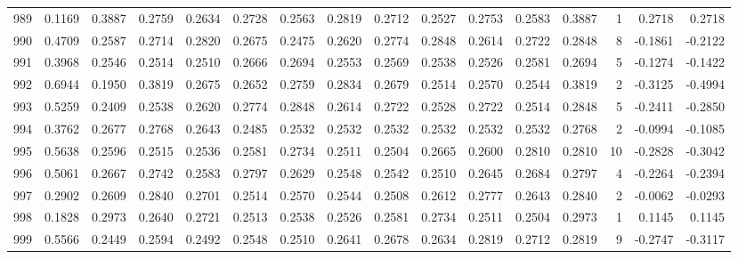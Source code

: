\begin{tabular}{lrrrrrrrrrrrrrrr}
989 &      0.1169 &  0.3887 &  0.2759 &  0.2634 &  0.2728 &  0.2563 &  0.2819 &  0.2712 &  0.2527 &  0.2753 &   0.2583 &     0.3887 &      1 &                    0.2718 &                     0.2718 \\
990 &      0.4709 &  0.2587 &  0.2714 &  0.2820 &  0.2675 &  0.2475 &  0.2620 &  0.2774 &  0.2848 &  0.2614 &   0.2722 &     0.2848 &      8 &                   -0.1861 &                    -0.2122 \\
991 &      0.3968 &  0.2546 &  0.2514 &  0.2510 &  0.2666 &  0.2694 &  0.2553 &  0.2569 &  0.2538 &  0.2526 &   0.2581 &     0.2694 &      5 &                   -0.1274 &                    -0.1422 \\
992 &      0.6944 &  0.1950 &  0.3819 &  0.2675 &  0.2652 &  0.2759 &  0.2834 &  0.2679 &  0.2514 &  0.2570 &   0.2544 &     0.3819 &      2 &                   -0.3125 &                    -0.4994 \\
993 &      0.5259 &  0.2409 &  0.2538 &  0.2620 &  0.2774 &  0.2848 &  0.2614 &  0.2722 &  0.2528 &  0.2722 &   0.2514 &     0.2848 &      5 &                   -0.2411 &                    -0.2850 \\
994 &      0.3762 &  0.2677 &  0.2768 &  0.2643 &  0.2485 &  0.2532 &  0.2532 &  0.2532 &  0.2532 &  0.2532 &   0.2532 &     0.2768 &      2 &                   -0.0994 &                    -0.1085 \\
995 &      0.5638 &  0.2596 &  0.2515 &  0.2536 &  0.2581 &  0.2734 &  0.2511 &  0.2504 &  0.2665 &  0.2600 &   0.2810 &     0.2810 &     10 &                   -0.2828 &                    -0.3042 \\
996 &      0.5061 &  0.2667 &  0.2742 &  0.2583 &  0.2797 &  0.2629 &  0.2548 &  0.2542 &  0.2510 &  0.2645 &   0.2684 &     0.2797 &      4 &                   -0.2264 &                    -0.2394 \\
997 &      0.2902 &  0.2609 &  0.2840 &  0.2701 &  0.2514 &  0.2570 &  0.2544 &  0.2508 &  0.2612 &  0.2777 &   0.2643 &     0.2840 &      2 &                   -0.0062 &                    -0.0293 \\
998 &      0.1828 &  0.2973 &  0.2640 &  0.2721 &  0.2513 &  0.2538 &  0.2526 &  0.2581 &  0.2734 &  0.2511 &   0.2504 &     0.2973 &      1 &                    0.1145 &                     0.1145 \\
999 &      0.5566 &  0.2449 &  0.2594 &  0.2492 &  0.2548 &  0.2510 &  0.2641 &  0.2678 &  0.2634 &  0.2819 &   0.2712 &     0.2819 &      9 &                   -0.2747 &                    -0.3117 \\
\bottomrule
\end{tabular}
